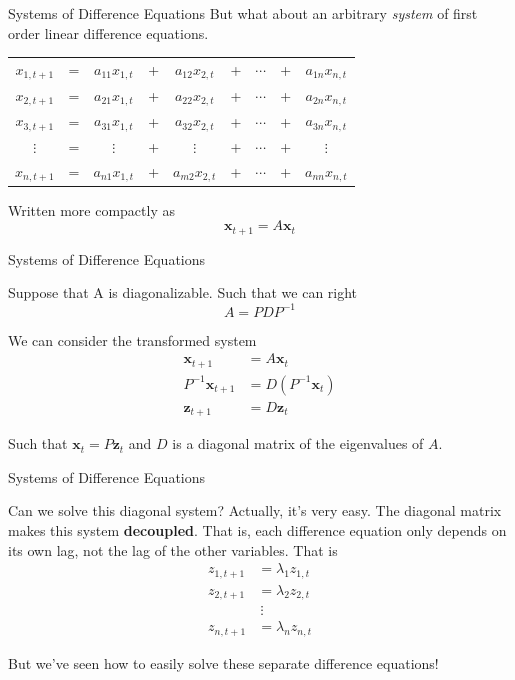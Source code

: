 \documentclass[11pt, xcolor={dvipsnames}, hyperref={colorlinks, allcolors=Blue}]{beamer}
\newcommand\bc[1]{{\usebeamercolor[fg]{frametitle} {\textbf{#1}}}} %
\newcommand{\x}{\mathbf{x}}
\newcommand{\z}{\mathbf{z}}
\begin{document}
\begin{frame}{Systems of Difference Equations}
But what about an arbitrary \emph{system} of first order linear difference equations. 

\begin{center}
\begin{tabular}{c c c c c c c c c}
$x_{1, t+1}$ & = & $a_{11}x_{1,t}$   &+&   $a_{12}x_{2,t}$      &+&    $\cdots$    &+&    $a_{1n}x_{n,t}$   \\
$x_{2, t+1}$ & = &$a_{21}x_{1,t}$   &+&   $a_{22}x_{2,t}$      &+ &   $\cdots$    &+&    $a_{2n}x_{n,t}$  \\
$x_{3, t+1}$ & = &$a_{31}x_{1,t}$   &+&   $a_{32}x_{2,t}$      &+&    $\cdots$    &+&    $a_{3n}x_{n,t}$ \\
$\vdots$ & =& $\vdots$               &+&        $\vdots$                &+&    $\cdots$    &+&    $\vdots$\\
$x_{n, t+1}$ & = & $a_{n1}x_{1,t}$  &+&   $a_{m2}x_{2,t}$   &+&    $\cdots$    &+&    $a_{nn}x_{n,t}$ 
\end{tabular}
\end{center}

Written more compactly as
\[ \x_{t+1} = A \x_{t}\]

\end{frame}

\begin{frame}{Systems of Difference Equations}

Suppose that A is diagonalizable. Such that we can right
\[A = PDP^{-1}\]

 We can consider the transformed system
 \begin{align*}
 \x_{t+1} &= A\x_t\\
 P^{-1}\x_{t+1} &= D\left ( P^{-1} \x_t\right)\\
 \z_{t+1} &= D \z_t
 \end{align*}


Such that $\x_t = P \z_t$ and $D$ is a diagonal matrix of the eigenvalues of $A$. 

\end{frame}

\begin{frame}{Systems of Difference Equations}

Can we solve this diagonal system? Actually, it's very easy. The diagonal matrix makes this system \bc{decoupled}. That is, each difference equation only depends on its own lag, not the lag of the other variables. That is
\begin{align*}
z_{1, t+1} &= \lambda_1 z_{1, t}\\
z_{2, t+1} &= \lambda_2 z_{2,t}\\
& \ \vdots\\
z_{n, t+1} &= \lambda_n z_{n, t}
\end{align*}

But we've seen how to easily solve these separate difference equations! 

\end{frame}
\end{document}
